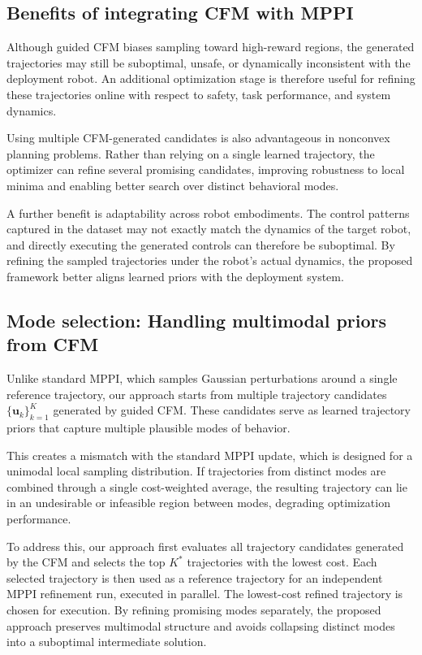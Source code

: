 \documentclass[letterpaper,10 pt,conference]{ieeeconf}
\begin{document}
\subsection{Benefits of integrating CFM with MPPI}
Although guided CFM biases sampling toward high-reward regions, the generated trajectories may still be suboptimal, unsafe, or dynamically inconsistent with the deployment robot. 
An additional optimization stage is therefore useful for refining these trajectories online with respect to safety, task performance, and system dynamics.

Using multiple CFM-generated candidates is also advantageous in nonconvex planning problems. 
Rather than relying on a single learned trajectory, the optimizer can refine several promising candidates, improving robustness to local minima and enabling better search over distinct behavioral modes.


A further benefit is adaptability across robot embodiments. 
The control patterns captured in the dataset may not exactly match the dynamics of the target robot, and directly executing the generated controls can therefore be suboptimal. 
By refining the sampled trajectories under the robot's actual dynamics, the proposed framework better aligns learned priors with the deployment system.


\subsection{Mode selection: Handling multimodal priors from CFM}
Unlike standard MPPI, which samples Gaussian perturbations around a single reference trajectory, our approach starts from multiple trajectory candidates $\{\mathbf{u}_k\}_{k=1}^K$ generated by guided CFM. 
These candidates serve as learned trajectory priors that capture multiple plausible modes of behavior.

This creates a mismatch with the standard MPPI update, which is designed for a unimodal local sampling distribution. 
If trajectories from distinct modes are combined through a single cost-weighted average, the resulting trajectory can lie in an undesirable or infeasible region between modes, degrading optimization performance.


To address this, our approach first evaluates all trajectory candidates generated by the CFM and selects the top $K^*$ trajectories with the lowest cost.
Each selected trajectory is then used as a reference trajectory for an independent MPPI refinement run, executed in parallel. 
The lowest-cost refined trajectory is chosen for execution. 
By refining promising modes separately, the proposed approach preserves multimodal structure and avoids collapsing distinct modes into a suboptimal intermediate solution.
\end{document}
